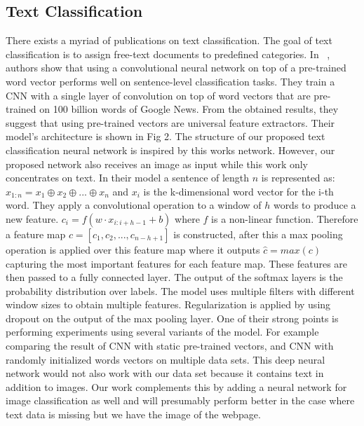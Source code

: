 \documentclass{article} %
\begin{document}
\subsection{Text Classification}

There exists a myriad of publications on text classification. The goal of text classification is to assign free-text documents to predefined categories. In ~\cite{convtext}, authors show that using a convolutional neural network on top of a pre-trained word vector performs well on sentence-level classification tasks. They train a CNN with a single layer of convolution on top of word vectors that are pre-trained on 100 billion words of Google News. From the obtained results, they suggest that using pre-trained vectors are universal feature extractors. Their model's architecture is shown in Fig 2. The structure of our proposed text classification neural network is inspired by this works network. However, our proposed network also receives an image as input while this work only concentrates on text.
In their model a sentence of length $n$ is represented as: $x_{1:n} = x_1 \oplus x_2 \oplus ... \oplus x_n$ and $x_i$ is the k-dimensional word vector for the i-th word. They apply a convolutional operation to a window of $h$ words to produce a new feature. $c_i = f(w\cdot x_{i:i+h-1} + b)$ where $f$ is a non-linear function. Therefore a feature map $c = [c_1, c_2, ...,c_{n-h+1}]$ is constructed, after this a max pooling operation is applied over this feature map where it outputs $\hat{c} = max(c)$ capturing the most important features for each feature map. These features are then passed to a fully connected  layer. The output of the softmax layers is the probability distribution over labels. The model uses multiple filters with different window sizes to obtain multiple features. Regularization is applied by using dropout on the output of the max pooling layer. One of their strong points is performing experiments using several variants of the model. For example comparing the result of CNN with static pre-trained vectors, and CNN with randomly initialized words vectors on multiple data sets. This deep neural network would not also work with our data set because it contains text in addition to images. Our work complements this by adding a neural network for image classification as well and will presumably perform better in the case where text data is missing but we have the image of the webpage.
\end{document}
